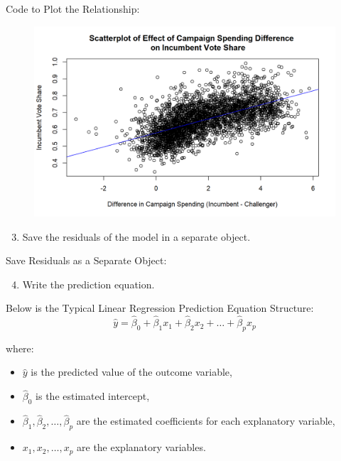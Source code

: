 \documentclass[12pt,letterpaper]{article}
\begin{document}
\noindent Code to Plot the Relationship:

\begin{figure}[H]
	\centering
	\includegraphics[width=1\textwidth]{Figure_1_1.png}
\end{figure}
	
\newpage	
\begin{enumerate}[left=0pt]
	\setcounter{enumi}{2}
		\item Save the residuals of the model in a separate object.
	\end{enumerate}
	
\noindent Save Residuals as a Separate Object:

	\begin{enumerate}[left=0pt]
	\setcounter{enumi}{3}
	
	\item Write the prediction equation.
	\end{enumerate}

Below is the Typical Linear Regression Prediction Equation Structure: 
\begin{equation}
	\hat{y} = \hat{\beta}_0 + \hat{\beta}_1 x_1 + \hat{\beta}_2 x_2 + \dots + \hat{\beta}_p x_p
\end{equation}

where:
\begin{itemize}
	\item $\hat{y}$ is the predicted value of the outcome variable,
	\item $\hat{\beta}_0$ is the estimated intercept,
	\item $\hat{\beta}_1, \hat{\beta}_2, \dots, \hat{\beta}_p$ are the estimated coefficients for each explanatory variable,
	\item $x_1, x_2, \dots, x_p$ are the explanatory variables.
\end{itemize}
\end{document}
